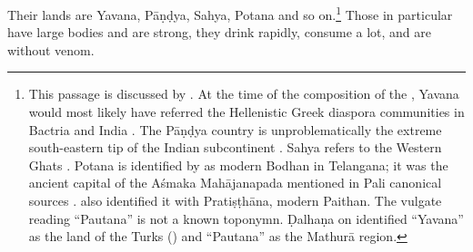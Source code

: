 \begin{translation}
Their lands are Yavana, Pāṇḍya, Sahya, Potana and so on.\footnote{This
    passage is discussed by \citet[109--110, 388--389]{kart-2015}.  At the time
    of the composition of the \SS, Yavana would most likely have referred the
    Hellenistic Greek diaspora communities in Bactria and India
    \parencites[136--137]{law-1984}{mair-2013}{mair-2014}. The Pāṇḍya country is
    unproblematically the extreme south-eastern tip of the Indian subcontinent
    \citep[E8, p.\,20 \emph{et passim}]{schw-1978}.  Sahya refers to the Western
    Ghats \citep[D5--7, p.\,20 \emph{et passim}]{schw-1978}.  Potana is
    identified by \citet[E6, p.\,14, 140 \emph{et passim}]{schw-1978} as modern
    Bodhan in Telangana; it was the ancient capital of the Aśmaka Mahājanapada
    mentioned in Pali canonical sources \citep[see also][142]{law-1984}.
    \citet[179]{law-1984} also identified it with Pratiṣṭhāna, modern Paithan.
    The vulgate reading “Pautana” is not a known toponymn.  Ḍalhaṇa on
     identified “Yavana” as the land of the Turks
    () and “Pautana” as the Mathurā region.}  Those in particular 
    have large bodies and are strong, they drink rapidly, consume a lot, and are
    without venom.
    
\end{translation}



